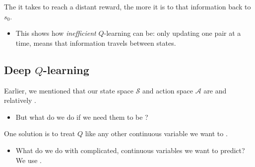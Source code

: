         \begin{concept}
            The  it takes to reach a distant reward, the more  it is to  that information back to $s_0$.

            \begin{itemize}
                \item This shows how \textit{inefficient} $Q$-learning can be: only updating one  pair at a time, means that information travels  between states.
            \end{itemize}
        \end{concept}

        

        

        
        


    



    \pagebreak

    \subsection{Deep $Q$-learning}

        Earlier, we mentioned that our state space $\mathcal{S}$ and action space $\mathcal{A}$ are  and relatively .

        \begin{itemize}
            \item But what do we do if we need them to be ?

        \end{itemize}

        One solution is to treat $Q$ like any other continuous variable we want to .

        \begin{itemize}
            \item What do we do with complicated, continuous variables we want to predict? We use .\\
        \end{itemize}

